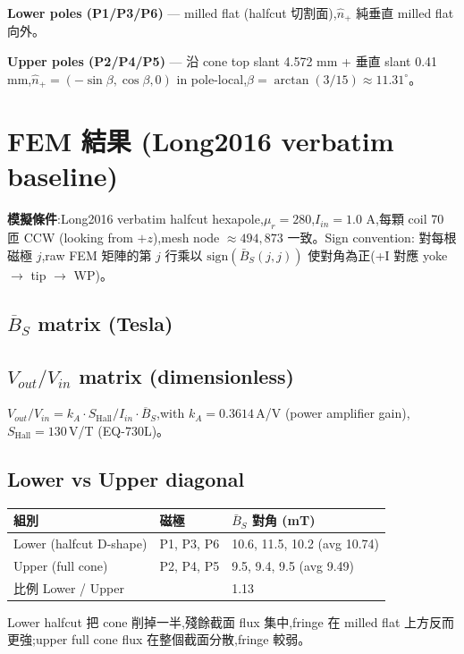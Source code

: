\documentclass[12pt,a4paper]{article}
\begin{document}
\textbf{Lower poles (P1/P3/P6)} — milled flat (halfcut 切割面),$\hat{n}_+$ 純垂直 milled flat 向外。

\textbf{Upper poles (P2/P4/P5)} — 沿 cone top slant 4.572 mm + 垂直 slant 0.41 mm,$\hat{n}_+ = (-\sin\beta, \cos\beta, 0)$ in pole-local,$\beta = \arctan(3/15) \approx 11.31^\circ$。

\section{FEM 結果 (Long2016 verbatim baseline)}

\textbf{模擬條件}:Long2016 verbatim halfcut hexapole,$\mu_r = 280$,$I_{in} = 1.0$ A,每顆 coil 70 匝 CCW (looking from $+z$),mesh node $\approx 494{,}873$ 一致。Sign convention: 對每根磁極 $j$,raw FEM 矩陣的第 $j$ 行乘以 $\mathrm{sign}(\bar{B}_S(j,j))$ 使對角為正(+I 對應 yoke $\to$ tip $\to$ WP)。

\subsection{$\overline{B}_S$ matrix (Tesla)}



\subsection{$V_{out}/V_{in}$ matrix (dimensionless)}

$V_{out}/V_{in} = k_A \cdot S_{\mathrm{Hall}} / I_{in} \cdot \overline{B}_S$,with $k_A = 0.3614$\,A/V (power amplifier gain),$S_{\mathrm{Hall}} = 130$\,V/T (EQ-730L)。



\subsection{Lower vs Upper diagonal}

\begin{tabular}{lll}
\hline
組別 & 磁極 & $\bar{B}_S$ 對角 (mT) \\
\hline
Lower (halfcut D-shape) & P1, P3, P6 & 10.6, 11.5, 10.2 (avg 10.74) \\
Upper (full cone)       & P2, P4, P5 & 9.5, 9.4, 9.5 (avg 9.49) \\
\hline
\multicolumn{2}{l}{比例 Lower / Upper} & 1.13 \\
\hline
\end{tabular}

Lower halfcut 把 cone 削掉一半,殘餘截面 flux 集中,fringe 在 milled flat 上方反而更強;upper full cone flux 在整個截面分散,fringe 較弱。
\end{document}
